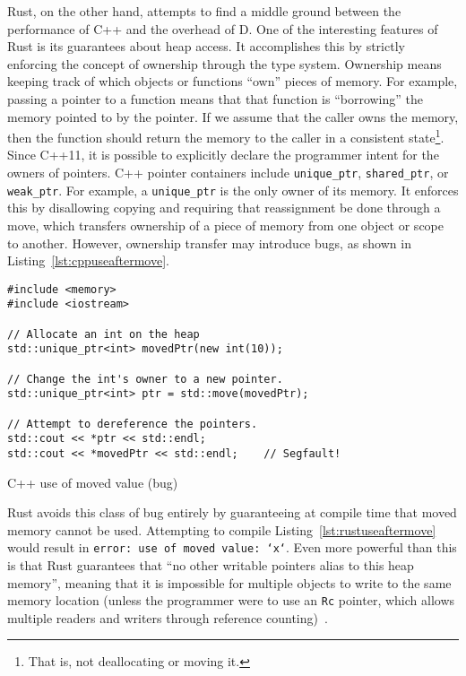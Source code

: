 \documentclass[finalcopy]{srpaper}
\begin{document}
Rust, on the other hand, attempts to find a middle ground between the
performance of C++ and the overhead of D. One of the interesting features of
Rust is its guarantees about heap access. It accomplishes this by strictly
enforcing the concept of ownership through the type system. Ownership means
keeping track of which objects or functions ``own'' pieces of memory. For
example, passing a pointer to a function means that that function is
``borrowing'' the memory pointed to by the pointer. If we assume that the
caller owns the memory, then the function should return the memory to the
caller in a consistent state\footnote{That is, not deallocating or moving it.}.
Since C++11, it is possible to explicitly declare the programmer intent for the
owners of pointers. C++ pointer containers include \texttt{unique\_ptr},
\texttt{shared\_ptr}, or \texttt{weak\_ptr}. For example, a
\texttt{unique\_ptr} is the only owner of its memory. It enforces this by
disallowing copying and requiring that reassignment be done through a move,
which transfers ownership of a piece of memory from one object or scope to
another. However, ownership transfer may introduce bugs, as shown in
Listing~\ref{lst:cppuseaftermove}.

\begin{listing}[h]
\begin{verbatim}
#include <memory>
#include <iostream>

// Allocate an int on the heap
std::unique_ptr<int> movedPtr(new int(10));

// Change the int's owner to a new pointer.
std::unique_ptr<int> ptr = std::move(movedPtr);

// Attempt to dereference the pointers.
std::cout << *ptr << std::endl;
std::cout << *movedPtr << std::endl;    // Segfault!
\end{verbatim}
\caption{C++ use of moved value (bug)}
\label{lst:cppuseaftermove}
\end{listing}

Rust avoids this class of bug entirely by guaranteeing at compile time that
moved memory cannot be used. Attempting to compile
Listing~\ref{lst:rustuseaftermove} would result in \texttt{error: use of moved
value: `x`}. Even more powerful than this is that Rust guarantees that ``no
other writable pointers alias to this heap memory'', meaning that it is
impossible for multiple objects to write to the same memory location (unless
the programmer were to use an \texttt{Rc} pointer, which allows multiple
readers and writers through reference counting)~\cite{RustPointerGuide}.
\end{document}
